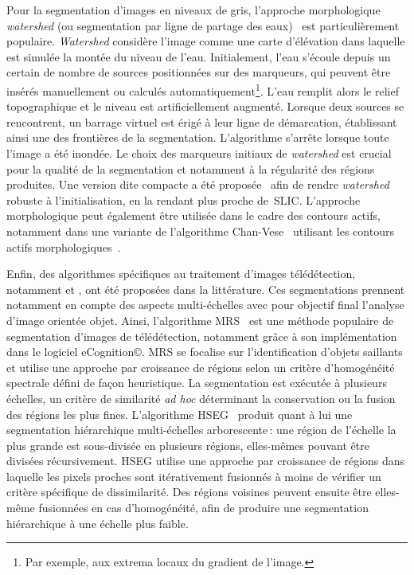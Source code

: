 Pour la segmentation d'images en niveaux de gris, l'approche morphologique \emph{watershed} (ou segmentation par ligne de partage des eaux)~\cite{beucher_morphological_1993} est particulièrement populaire. \emph{Watershed} considère l'image comme une carte d'élévation dans laquelle est simulée la montée du niveau de l'eau. Initialement, l'eau s'écoule depuis un certain de nombre de sources positionnées sur des marqueurs, qui peuvent être insérés manuellement ou calculés automatiquement\footnote{Par exemple, aux extrema locaux du gradient de l'image.}. L'eau remplit alors le relief topographique et le niveau est artificiellement augmenté. Lorsque deux sources se rencontrent, un barrage virtuel est érigé à leur ligne de démarcation, établissant ainsi une des frontières de la segmentation. L'algorithme s'arrête lorsque toute l'image a été inondée. Le choix des marqueurs initiaux de \emph{watershed} est crucial pour la qualité de la segmentation et notamment à la régularité des régions produites. Une version dite compacte a été proposée~\cite{neubert_compact_2014} afin de rendre \emph{watershed} robuste à l'initialisation, en la rendant plus proche de~\gls{SLIC}. L'approche morphologique peut également être utilisée dans le cadre des contours actifs, notamment dans une variante de l'algorithme Chan-Vese~\cite{chan_active_1999} utilisant les contours actifs morphologiques~\cite{marquez-neila_morphological_2014}.

Enfin, des algorithmes spécifiques au traitement d'images télédétection, notamment  et , ont été proposées dans la littérature. Ces segmentations prennent notamment en compte des aspects multi-échelles avec pour objectif final l'analyse d'image orientée objet. Ainsi, l'algorithme \gls{MRS}~\cite{baatz_multiresolution_2000} est une méthode populaire de segmentation d'images de télédétection, notamment grâce à son implémentation dans le logiciel eCognition\copyright. \gls{MRS} se focalise sur l'identification d'objets saillants et utilise une approche par croissance de régions selon un critère d'homogénéité spectrale défini de façon heuristique. La segmentation est exécutée à plusieurs échelles, un critère de similarité \emph{ad hoc} déterminant la conservation ou la fusion des régions les plus fines.
L'algorithme \gls{HSEG}~\cite{tilton_best_2012} produit quant à lui une segmentation hiérarchique multi-échelles arborescente\,: une région de l'échelle la plus grande est sous-divisée en plusieurs régions, elles-mêmes pouvant être divisées récursivement. \gls{HSEG} utilise une approche par croissance de régions dans laquelle les pixels proches sont itérativement fusionnés à moins de vérifier un critère spécifique de dissimilarité. Des régions voisines peuvent ensuite être elles-même fusionnées en cas d'homogénéité, afin de produire une segmentation hiérarchique à une échelle plus faible.

